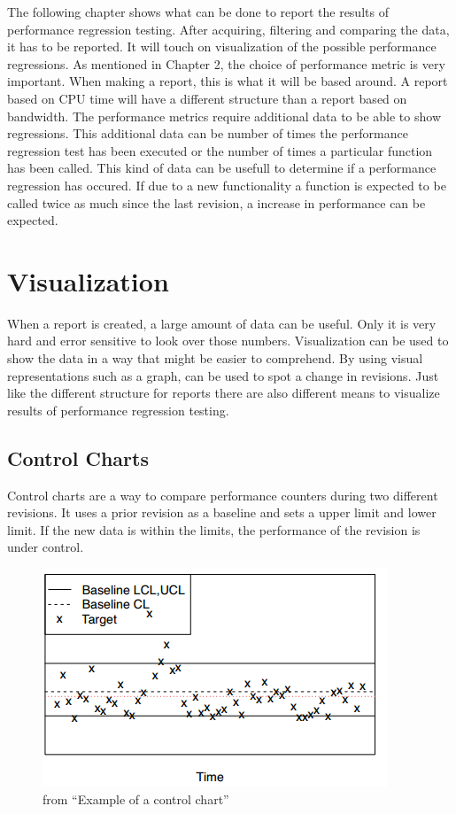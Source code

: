 The following chapter shows what can be done to report the results of performance regression testing. After acquiring, filtering and comparing the data, it has to be reported. It will touch on visualization of the possible performance regressions. \newline
\newline
As mentioned in Chapter 2, the choice of performance metric is very important. When making a report, this is what it will be based around. A report based on CPU time will have a different structure than a report based on bandwidth. The performance metrics require additional data to be able to show regressions. This additional data can be number of times the performance regression test has been executed or the number of times a particular function has been called. This kind of data can be usefull to determine if a performance regression has occured. If due to a new functionality a function is expected to be called twice as much since the last revision, a increase in performance can be expected.\newline

\section{Visualization}
When a report is created, a large amount of data can be useful. Only it is very hard and error sensitive to look over those numbers. Visualization can be used to show the data in a way that might be easier to comprehend. By using visual representations such as a graph, can be used to spot a change in revisions. Just like the different structure for reports there are also different means to visualize results of performance regression testing.\newline
\subsection{Control Charts}
Control charts are a way to compare performance counters during two different revisions. It uses a prior revision as a baseline and sets a upper limit and lower limit. If the new data is within the limits, the performance of the revision is under control.
\begin{figure}[h]
\begin{center}
  \includegraphics[scale=0.7]{Figures/controlchart.png}
\end{center}
  \caption{from ``Example of a control chart''\cite{nguyen2012using}}

\end{figure}

